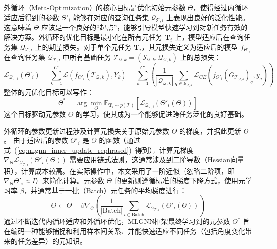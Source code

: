 外循环（Meta-Optimization）的核心目标是优化初始元参数 $\Theta$，使得经过内循环适应后得到的参数 $\Theta'_i$ 能够在对应的查询任务集 $\mathcal{Q}_{\mathcal{T},i}$ 上表现出良好的泛化性能。 这意味着 $\Theta$ 应该是一个良好的“起点”，能够引导模型快速学习到对新任务有效的解决方案。外循环的优化目标是最小化在所有元任务 $\mathbf{T}_i$ 上，模型适应后在查询任务集 $\mathcal{Q}_{\mathcal{T},i}$ 上的期望损失。对于单个元任务 $\mathbf{T}_i$，其元损失定义为适应后的模型 $f_{\Theta'_i}$ 在查询任务集 $\mathcal{Q}_{\mathcal{T},i}$ 中所有基础任务 $\mathcal{T}_{\mathcal{Q},k} = (\mathcal{S}_{\mathcal{Q},k}, \mathcal{Q}_{\mathcal{Q},k})$ 上的总损失：
\begin{equation}
    \mathcal{L}_{\mathcal{Q}_{\mathcal{T},i}}(\Theta'_i) = \sum_{k=1}^{C'} \mathcal{L}(f_{\Theta'_i}(\mathcal{T}_{\mathcal{Q},k}), Y_k) = \sum_{k=1}^{C'} \left( \frac{1}{|\mathcal{Q}_{\mathcal{Q},k}|} \sum_{q \in \mathcal{Q}_{\mathcal{Q},k}} \mathcal{L}_{CE}(f_{\Theta'_i}(G_{\mathcal{T}_{\mathcal{Q},k}})_q, y_q) \right)
    \label{eq:meta_task_query_loss}
\end{equation}
整体的元优化目标可以写作：
\begin{equation}
    \Theta^* = \arg\min_{\Theta} \mathbb{E}_{\mathbf{T}_i \sim p(\mathcal{T})} [\mathcal{L}_{\mathcal{Q}_{\mathcal{T},i}}(\Theta'_i(\Theta))]
    \label{eq:meta_optimization_objective_rephrased}
\end{equation}
这个目标驱动元参数 $\Theta$ 的学习，使其成为一个能够促进跨任务泛化的良好基础。

外循环的参数更新过程涉及计算元损失关于原始元参数 $\Theta$ 的梯度，并据此更新 $\Theta$。 由于适应后的参数 $\Theta'_i$ 是 $\Theta$ 的函数（通过式~(\ref{eq:mlgnn_inner_update_rephrased})~得到），计算元梯度 $\nabla_{\Theta} \mathcal{L}_{\mathcal{Q}_{\mathcal{T},i}}(\Theta'_i(\Theta))$ 需要应用链式法则，这通常涉及到二阶导数（Hessian向量积），计算成本较高。在实际操作中，本文采用了一阶近似（忽略二阶项，即 $\nabla_{\Theta} \Theta'_i \approx I$）来简化计算。元参数 $\Theta$ 的更新则遵循标准的梯度下降方式，使用元学习率 $\beta$，并通常基于一批（Batch）元任务的平均梯度进行：
\begin{equation}
    \Theta \leftarrow \Theta - \beta \nabla_{\Theta} \left( \frac{1}{|\text{Batch}|} \sum_{i \in \text{Batch}} \mathcal{L}_{\mathcal{Q}_{\mathcal{T},i}}(\Theta'_i(\Theta)) \right)
    \label{eq:mlgnn_outer_update_rephrased}
\end{equation}
通过不断迭代内循环适应和外循环优化，MLGNN框架最终学习到的元参数 $\Theta^*$ 旨在编码一种能够捕捉和利用样本间关系、并能快速适应不同任务（包括角度变化带来的任务差异）的元知识。


